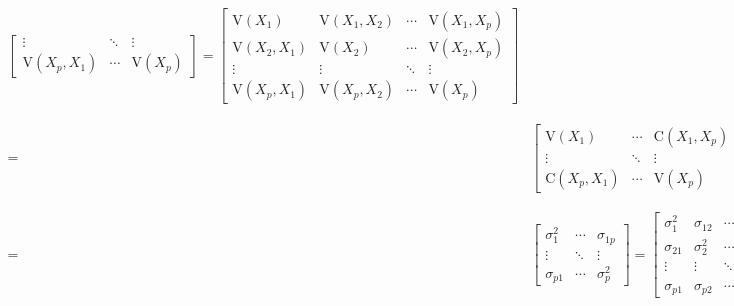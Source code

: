\documentclass[
]{book}
\theoremstyle{definition}
\theoremstyle{definition}
\theoremstyle{definition}
\theoremstyle{definition}
\theoremstyle{remark}
\begin{document}
\begin{align}
\begin{bmatrix}
\vdots & \ddots & \vdots\\
\mathrm{V}\left(X_{p},X_{1}\right) & \cdots & \mathrm{V}\left(X_{p}\right)
\end{bmatrix}=\begin{bmatrix}\mathrm{V}\left(X_{1}\right) & \mathrm{V}\left(X_{1},X_{2}\right) & \cdots & \mathrm{V}\left(X_{1},X_{p}\right)\\
\mathrm{V}\left(X_{2},X_{1}\right) & \mathrm{V}\left(X_{2}\right) & \cdots & \mathrm{V}\left(X_{2},X_{p}\right)\\
\vdots & \vdots & \ddots & \vdots\\
\mathrm{V}\left(X_{p},X_{1}\right) & \mathrm{V}\left(X_{p},X_{2}\right) & \cdots & \mathrm{V}\left(X_{p}\right)
\end{bmatrix}\\
= & \begin{bmatrix}\mathrm{V}\left(X_{1}\right) & \cdots & \mathrm{C}\left(X_{1},X_{p}\right)\\
\vdots & \ddots & \vdots\\
\mathrm{C}\left(X_{p},X_{1}\right) & \cdots & \mathrm{V}\left(X_{p}\right)
\end{bmatrix}=\begin{bmatrix}\mathrm{V}\left(X_{1}\right) & \mathrm{C}\left(X_{1},X_{2}\right) & \cdots & \mathrm{C}\left(X_{1},X_{p}\right)\\
\mathrm{C}\left(X_{2},X_{1}\right) & \mathrm{V}\left(X_{2}\right) & \cdots & \mathrm{C}\left(X_{2},X_{p}\right)\\
\vdots & \vdots & \ddots & \vdots\\
\mathrm{C}\left(X_{p},X_{1}\right) & \mathrm{C}\left(X_{p},X_{2}\right) & \cdots & \mathrm{V}\left(X_{p}\right)
\end{bmatrix}\\
= & \begin{bmatrix}\sigma_{1}^{2} & \cdots & \sigma_{1p}\\
\vdots & \ddots & \vdots\\
\sigma_{p1} & \cdots & \sigma_{p}^{2}
\end{bmatrix}=\begin{bmatrix}\sigma_{1}^{2} & \sigma_{12} & \cdots & \sigma_{1p}\\
\sigma_{21} & \sigma_{2}^{2} & \cdots & \sigma_{2p}\\
\vdots & \vdots & \ddots & \vdots\\
\sigma_{p1} & \sigma_{p2} & \cdots & \sigma_{p}^{2}
\end{bmatrix}=\begin{bmatrix}\sigma_{11} & \sigma_{12} & \cdots & \sigma_{1p}\\
\sigma_{21} & \sigma_{22} & \cdots & \sigma_{2p}\\
\vdots & \vdots & \ddots & \vdots\\
\sigma_{p1} & \sigma_{p2} & \cdots & \sigma_{pp}
\end{bmatrix}=\left[\sigma_{ij}\right]_{p\times p}=\mathit{\Sigma}
\end{align}
\end{document}
